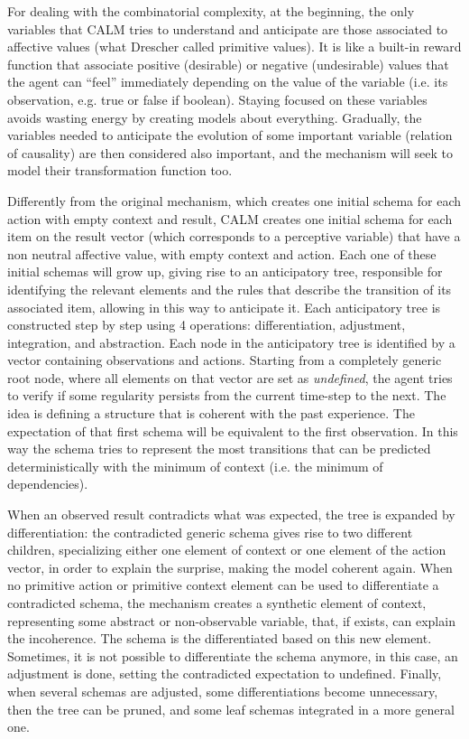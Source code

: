 \documentclass[runningheads]{llncs}
\begin{document}
For dealing with the combinatorial complexity, at the beginning, the only variables that CALM tries to understand and anticipate are those associated to affective values (what Drescher called primitive values).
It is like a built-in reward function that associate positive (desirable) or negative (undesirable) values that the agent can ``feel'' immediately depending on the value of the variable (i.e. its observation, e.g. true or false if boolean).
Staying focused on these variables avoids wasting energy by creating models about everything. 
Gradually, the variables needed to anticipate the evolution of some important variable (relation of causality) are then considered also important, and the mechanism will seek to model their transformation function too.

Differently from the original mechanism, which creates one initial schema for each action with empty context and result, CALM creates one initial schema for each item on the result vector (which corresponds to a perceptive variable) that have a non neutral affective value, with empty context and action.
Each one of these initial schemas will grow up, giving rise to an anticipatory tree, responsible for identifying the relevant elements and the rules that describe the transition of its associated item, allowing in this way to anticipate it. 
Each anticipatory tree is constructed step by step using 4 operations: differentiation, adjustment, integration, and abstraction.
Each node in the anticipatory tree is identified by a vector containing observations and actions. 
Starting from a completely generic root node, where all elements on that vector are set as \textit{undefined}, the agent tries to verify if some regularity persists from the current time-step to the next.
The idea is defining a structure that is coherent with the past experience.
The expectation of that first schema will be equivalent to the first observation. 
In this way the schema tries to represent the most transitions that can be predicted deterministically with the minimum of context (i.e. the minimum of dependencies).

When an observed result contradicts what was expected, the tree is expanded by differentiation: the contradicted generic schema gives rise to two different children, specializing either one element of context or one element of the action vector, in order to explain the surprise, making the model coherent again.
When no primitive action or primitive context element can be used to differentiate a contradicted schema, the mechanism creates a synthetic element of context, representing some abstract or non-observable variable, that, if exists, can explain the incoherence. The schema is the differentiated based on this new element.
Sometimes, it is not possible to differentiate the schema anymore, in this case, an adjustment is done, setting the contradicted expectation to undefined.
Finally, when several schemas are adjusted, some differentiations become unnecessary, then the tree can be pruned, and some leaf schemas integrated in a more general one.
\end{document}
